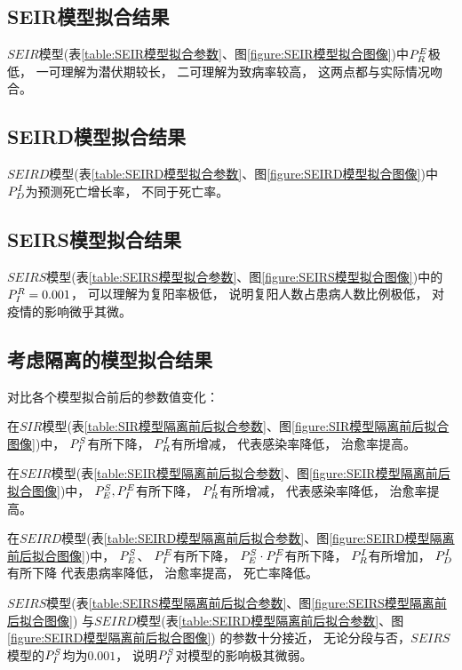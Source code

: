 \subsection{SEIR模型拟合结果}
\par $SEIR$模型(表\ref{table:SEIR模型拟合参数}、图\ref{figure:SEIR模型拟合图像})中$\P{E}{R}$极低，
一可理解为潜伏期较长，
二可理解为致病率较高，
这两点都与实际情况吻合。
\subsection{SEIRD模型拟合结果}
\par $SEIRD$模型(表\ref{table:SEIRD模型拟合参数}、图\ref{figure:SEIRD模型拟合图像})中$\P{I}{D}$为预测死亡增长率，
不同于死亡率。
\subsection{SEIRS模型拟合结果}
\par $SEIRS$模型(表\ref{table:SEIRS模型拟合参数}、图\ref{figure:SEIRS模型拟合图像})中的$\P{R}{I}=0.001$，
可以理解为复阳率极低，
说明复阳人数占患病人数比例极低，
对疫情的影响微乎其微。
\subsection{考虑隔离的模型拟合结果}
\par 对比各个模型拟合前后的参数值变化：
\par 在$SIR$模型(表\ref{table:SIR模型隔离前后拟合参数}、图\ref{figure:SIR模型隔离前后拟合图像})中，
$\P{S}{I}$有所下降，
$\P{I}{R}$有所增减，
代表感染率降低，
治愈率提高。
\par 在$SEIR$模型(表\ref{table:SEIR模型隔离前后拟合参数}、图\ref{figure:SEIR模型隔离前后拟合图像})中，
$\P{S}{E},\P{E}{I}$有所下降，
$\P{I}{R}$有所增减，
代表感染率降低，
治愈率提高。
\par 在$SEIRD$模型(表\ref{table:SEIRD模型隔离前后拟合参数}、图\ref{figure:SEIRD模型隔离前后拟合图像})中，
$\P{S}{E}$、
$\P{E}{I}$有所下降，
$\P{S}{E}\cdot \P{E}{I}$有所下降，
$\P{I}{R}$有所增加，
$\P{I}{D}$有所下降
代表患病率降低，
治愈率提高，
死亡率降低。
\par $SEIRS$模型(表\ref{table:SEIRS模型隔离前后拟合参数}、图\ref{figure:SEIRS模型隔离前后拟合图像})
与$SEIRD$模型(表\ref{table:SEIRD模型隔离前后拟合参数}、图\ref{figure:SEIRD模型隔离前后拟合图像})
的参数十分接近，
无论分段与否，$SEIRS$模型的$\P{S}{I}$均为$0.001$，
说明$\P{S}{I}$对模型的影响极其微弱。
